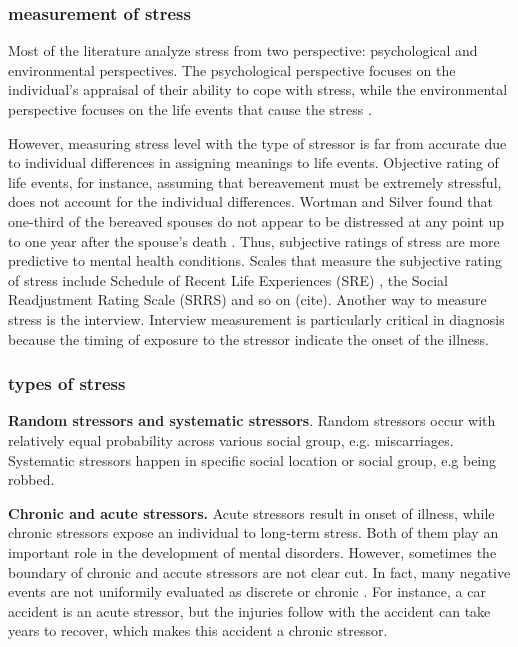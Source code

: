 \subsubsection{measurement of stress}
Most of the literature analyze stress from two perspective: psychological and environmental perspectives. The psychological perspective focuses on the individual's appraisal of their ability to cope with stress, while the environmental perspective focuses on the life events that cause the stress \cite{mcgrath1970social}. 

However, measuring stress level with the type of stressor is far from accurate due to individual differences in assigning meanings to life events. Objective rating of life events, for instance, as{}suming that bereavement must be extremely stressful, does not account for the individual differences.  Wortman and Silver found that one-third of the bereaved spouses do not appear to be distressed at any point up to one year after the spouse's death \cite{wortman1989myths}. Thus, subjective ratings of stress are more predictive to mental health conditions.  Scales that measure the subjective rating of stress include Schedule of Recent Life Experiences (SRE) \cite{nuckolls1972psychosocial}, the Social Readjustment Rating Scale (SRRS) and so on (cite). Another way to measure stress is the interview. Interview measurement is particularly critical in diagnosis because the timing of exposure to the stressor indicate the onset of the illness.


\subsubsection{types of stress}
\textbf{Random stressors and systematic stressors}. Random stressors occur with relatively equal probability across various social group, e.g. miscarriages. Systematic stressors happen in specific social location or social group, e.g being robbed. 

\textbf{Chronic and acute stressors.}  Acute stressors result in onset of illness, while chronic stressors expose an individual to long-term stress. Both of them play an important role in the development of mental disorders. However, sometimes the boundary of chronic and accute stressors are not clear cut. In fact, many negative events are not uniformily evaluated as discrete or chronic \cite{avison1988stressful}. For instance, a car accident is an acute stressor, but the injuries follow with the accident can take years to recover, which makes this accident a chronic stressor.

